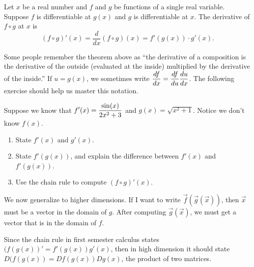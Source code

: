 \begin{theorem}
 Let $x$ be a real number and $f$ and $g$ be functions of a single real variable. Suppose $f$ is differentiable at $g(x)$ and $g$ is differentiable at $x$. The derivative of $f\circ g$ at $x$ is 
$$(f\circ g)'(x) = \frac{d}{dx}(f\circ g)(x) = f'(g(x))\cdot g'(x).$$
\end{theorem}

Some people remember the theorem above as ``the derivative of a composition is the derivative of the outside (evaluated at the inside) multiplied by the derivative of the inside.'' If $u=g(x)$, we sometimes write $\displaystyle \frac{df}{dx}=\frac{df}{du}\frac{du}{dx}$. The following exercise should help us master this notation.

\begin{problem}\label{prob:chain rule review}
 Suppose we know that $\displaystyle f'(x) = \frac{\sin(x)}{2x^2+3}$ and $g(x)=\sqrt{x^2+1}$. Notice we don't know $f(x)$. 
\begin{enumerate}
 \item State $f'(x)$ and $g'(x)$.
 \item State $f'(g(x))$, and explain the difference between $f'(x)$ and $f'(g(x))$. 
 \item Use the chain rule to compute $(f\circ g)'(x)$. 
\end{enumerate}
\end{problem}

We now generalize to higher dimensions. If I want to write $\vec f(\vec g(\vec x))$, then $\vec x$ must be a vector in the domain of $g$.  After computing $\vec g(\vec x)$, we must get a vector that is in the domain of $f$.  

Since the chain rule in first semester calculus states $(f(g(x))'=f'(g(x))g'(x)$, then in high dimension it should state $D(f(g(x)) = Df(g(x))Dg(x)$, the product of two matrices. 

